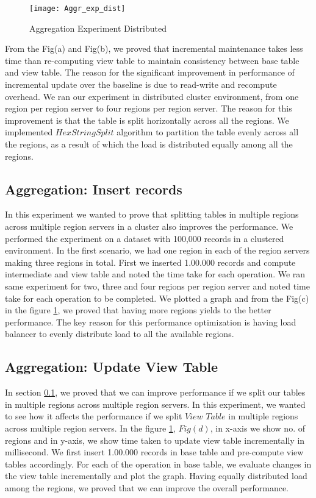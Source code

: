 \documentclass[11pt,a4paper,bibtotoc,idxtotoc,headsepline,footsepline,footexclude,BCOR12mm,DIV13]{scrbook}
\begin{document}
\begin{figure}
	\centering
	\texttt{[image: Aggr\_exp\_dist]}
	\caption{Aggregation Experiment Distributed}
	\label{sec:AggrExpDist}
	
\end{figure} 
\newpage

From the Fig(a) and Fig(b), we proved that incremental maintenance takes less time than re-computing view table to maintain consistency between base table and view table. The reason for the significant improvement in performance of incremental update over the baseline is due to read-write and recompute overhead. We ran our experiment in distributed cluster environment, from one region per region server to four regions per region server. The reason for this improvement is that the table is split horizontally across all the regions. We implemented $HexStringSplit$ algorithm  to partition the table evenly across all the regions, as a result of which the load is distributed equally among all the regions.


\subsection{Aggregation: Insert records}
\label{Insert Records Aggr Dist}
In this experiment we wanted to prove that splitting tables in multiple regions across multiple region servers in a cluster also improves the performance. We performed the experiment on a dataset with 100,000 records in a clustered environment. In the first scenario, we had one region in each of the region servers making three regions in total. First we inserted 1.00.000 records and compute intermediate and view table and noted the time take for each operation. We ran same experiment for two, three and four regions per region server and noted time take for each operation to be completed. We plotted a graph and from the Fig(c) in the figure \ref{sec:AggrExpDist}, we proved that having more regions yields to the better performance. The key reason for this performance optimization is having load balancer to evenly distribute load to all the available regions.


\subsection{Aggregation: Update View Table} 
\label{Update View Table Aggr Dist}
In section \ref{Insert Records Aggr Dist}, we proved that we can improve performance if we split our tables in multiple regions across multiple region servers. In this experiment, we wanted to see how it affects the performance if we split $View$ $Table$ in multiple regions across multiple region servers. In the figure \ref{sec:AggrExpDist}, $Fig(d)$, in x-axis we show no. of regions and in y-axis, we show time taken to update view table incrementally in millisecond. We first insert 1.00.000 records in base table and pre-compute view tables accordingly. For each of the operation in base table, we evaluate changes in the view table incrementally and plot the graph. Having equally distributed load among the regions, we proved that we can improve the overall performance.  
\end{document}

